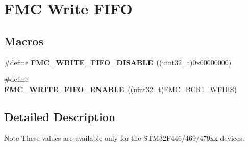 \hypertarget{group___f_m_c___write___f_i_f_o}{}\section{F\+MC Write F\+I\+FO}
\label{group___f_m_c___write___f_i_f_o}
\subsection*{Macros}
\begin{DoxyCompactItemize}
\item 
\#define {\bfseries F\+M\+C\+\_\+\+W\+R\+I\+T\+E\+\_\+\+F\+I\+F\+O\+\_\+\+D\+I\+S\+A\+B\+LE}~((uint32\+\_\+t)0x00000000)\hypertarget{group___f_m_c___write___f_i_f_o_ga396c155e0f664f909a2bff7e68f20aa1}{}\label{group___f_m_c___write___f_i_f_o_ga396c155e0f664f909a2bff7e68f20aa1}

\item 
\#define {\bfseries F\+M\+C\+\_\+\+W\+R\+I\+T\+E\+\_\+\+F\+I\+F\+O\+\_\+\+E\+N\+A\+B\+LE}~((uint32\+\_\+t)\hyperlink{group___peripheral___registers___bits___definition_ga9126627358994c4a4957d22187bb173d}{F\+M\+C\+\_\+\+B\+C\+R1\+\_\+\+W\+F\+D\+IS})\hypertarget{group___f_m_c___write___f_i_f_o_gaeb5fd2f03bcdf1bbdd63cfdfe2b4088b}{}\label{group___f_m_c___write___f_i_f_o_gaeb5fd2f03bcdf1bbdd63cfdfe2b4088b}

\end{DoxyCompactItemize}


\subsection{Detailed Description}
\begin{DoxyNote}{Note}
These values are available only for the S\+T\+M32\+F446/469/479xx devices. 
\end{DoxyNote}

